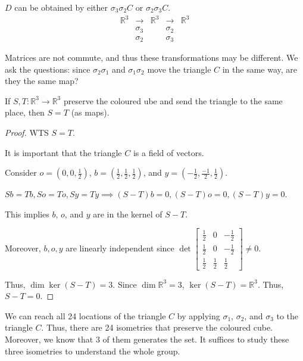 \begin{example}
\begin{center}
    \end{center}

    $D$ can be obtained by either $\sigma_3 \sigma_2 C$ or $\sigma_2 \sigma_3 C$. \[ \begin{matrix}
        \mathbb{R}^3 & \to & \mathbb{R}^3 & \to & \mathbb{R}^3 \\
        & \sigma_3 & & \sigma_2 & \\
        & \sigma_2 & & \sigma_3 &
    \end{matrix} \]

    Matrices are not commute, and thus these transformations may be different. We ask the questions: since $\sigma_2 \sigma_1$ and $\sigma_1 \sigma_2$ move the triangle $C$ in the same way, are they the same map?

    \begin{proposition}
        If $S, T: \mathbb{R}^3 \to \mathbb{R}^3$ preserve the coloured ube and send the triangle to the same place, then $S = T$ (as maps). 
    \end{proposition}

    \begin{proof}
        WTS $S = T$.

        \begin{remark}
            It is important that the triangle $C$ is a field of vectors. 
        \end{remark}
        Consider $o = (0, 0, \frac{1}{2})$, $b = (\frac{1}{2}, \frac{1}{2}, \frac{1}{2})$, and $y = (-\frac{1}{2}, \frac{-1}{2}, \frac{1}{2})$. 

        $Sb = Tb, So = To, Sy = Ty \implies (S - T)b = 0, (S - T)o = 0, (S - T)y = 0$.

        This implies $b$, $o$, and $y$ are in the kernel of $S - T$. 

        Moreover, $b, o, y$ are linearly independent since $\det \begin{bmatrix}
            \frac{1}{2} & 0 & -\frac{1}{2} \\
            \frac{1}{2} & 0 & -\frac{1}{2} \\
            \frac{1}{2} & \frac{1}{2} & \frac{1}{2}
        \end{bmatrix} \neq 0$.

        Thus, $\dim \ker (S - T) = 3$. Since $\dim \mathbb{R}^3 = 3$, $\ker (S - T) = \mathbb{R}^3$. Thus, $S - T = 0$.
    \end{proof}

    We can reach all 24 locations of the triangle $C$ by applying $\sigma_1$, $\sigma_2$, and $\sigma_3$ to the triangle $C$. Thus, there are 24 isometries that preserve the coloured cube. Moreover, we know that $3$ of them generates the set. It suffices to study these three isometries to understand the whole group.
\end{example}